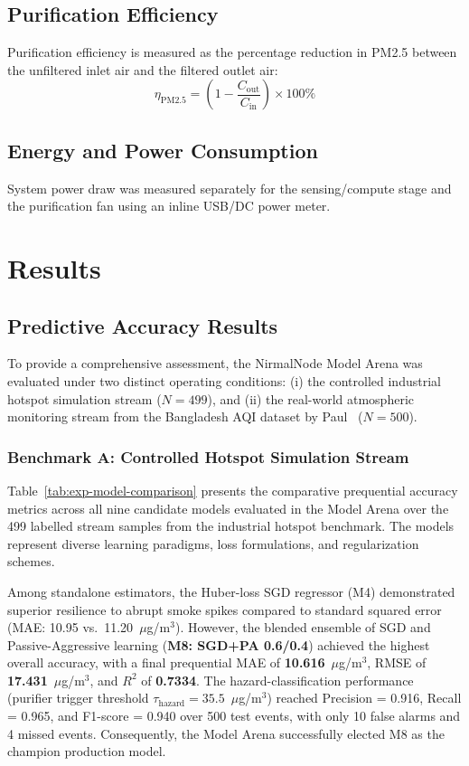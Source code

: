 \subsection{Purification Efficiency}
Purification efficiency is measured as the percentage reduction in PM2.5 between the unfiltered inlet air and the filtered outlet air:
\begin{equation}
\eta_{\mathrm{PM2.5}} = \left(1 - \frac{C_{\mathrm{out}}}{C_{\mathrm{in}}}\right) \times 100\%
\label{eq:purification-efficiency}
\end{equation}

\subsection{Energy and Power Consumption}
System power draw was measured separately for the sensing/compute stage and the purification fan using an inline USB/DC power meter.

\section{Results}
\label{sec:exp-results}

\subsection{Predictive Accuracy Results}
\label{sec:exp-accuracy-result}

To provide a comprehensive assessment, the NirmalNode Model Arena was evaluated under two distinct operating conditions: (i) the controlled industrial hotspot simulation stream ($N = 499$), and (ii) the real-world atmospheric monitoring stream from the Bangladesh AQI dataset by Paul~\cite{paul2026bangladesh} ($N = 500$).

\subsubsection{Benchmark A: Controlled Hotspot Simulation Stream}
Table~\ref{tab:exp-model-comparison} presents the comparative prequential accuracy metrics across all nine candidate models evaluated in the Model Arena over the 499 labelled stream samples from the industrial hotspot benchmark. The models represent diverse learning paradigms, loss formulations, and regularization schemes.

Among standalone estimators, the Huber-loss SGD regressor (M4) demonstrated superior resilience to abrupt smoke spikes compared to standard squared error (MAE: 10.95 vs.\ 11.20~$\mu$g/m$^3$). However, the blended ensemble of SGD and Passive-Aggressive learning (\textbf{M8: SGD+PA 0.6/0.4}) achieved the highest overall accuracy, with a final prequential MAE of \textbf{10.616}~$\mu$g/m$^3$, RMSE of \textbf{17.431}~$\mu$g/m$^3$, and $R^2$ of \textbf{0.7334}. The hazard-classification performance (purifier trigger threshold $\tau_{\text{hazard}} = 35.5$~$\mu$g/m$^3$) reached Precision = 0.916, Recall = 0.965, and F1-score = 0.940 over 500 test events, with only 10 false alarms and 4 missed events. Consequently, the Model Arena successfully elected M8 as the champion production model.

